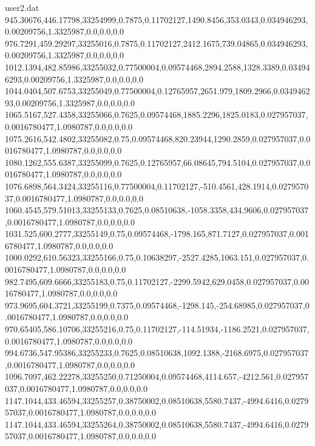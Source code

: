 \begin{filecontents}{user2.dat}
945.30676,446.17798,33254999,0.7875,0.11702127,1490.8456,353.0343,0.034946293,0.00209756,1.3325987,0.0,0.0,0.0
976.7291,459.29297,33255016,0.7875,0.11702127,2412.1675,739.04865,0.034946293,0.00209756,1.3325987,0.0,0.0,0.0
1012.1394,482.85986,33255032,0.77500004,0.09574468,2894.2588,1328.3389,0.034946293,0.00209756,1.3325987,0.0,0.0,0.0
1044.0404,507.6753,33255049,0.77500004,0.12765957,2651.979,1809.2966,0.034946293,0.00209756,1.3325987,0.0,0.0,0.0
1065.5167,527.4358,33255066,0.7625,0.09574468,1885.2296,1825.0183,0.027957037,0.0016780477,1.0980787,0.0,0.0,0.0
1075.2616,542.4802,33255082,0.75,0.09574468,820.23944,1290.2859,0.027957037,0.0016780477,1.0980787,0.0,0.0,0.0
1080.1262,555.6387,33255099,0.7625,0.12765957,66.08645,794.5104,0.027957037,0.0016780477,1.0980787,0.0,0.0,0.0
1076.6898,564.3424,33255116,0.77500004,0.11702127,-510.4561,428.1914,0.027957037,0.0016780477,1.0980787,0.0,0.0,0.0
1060.4545,579.51013,33255133,0.7625,0.08510638,-1058.3358,434.9606,0.027957037,0.0016780477,1.0980787,0.0,0.0,0.0
1031.525,600.2777,33255149,0.75,0.09574468,-1798.165,871.7127,0.027957037,0.0016780477,1.0980787,0.0,0.0,0.0
1000.0292,610.56323,33255166,0.75,0.10638297,-2527.4285,1063.151,0.027957037,0.0016780477,1.0980787,0.0,0.0,0.0
982.7495,609.6666,33255183,0.75,0.11702127,-2299.5942,629.0458,0.027957037,0.0016780477,1.0980787,0.0,0.0,0.0
973.9695,604.3721,33255199,0.7375,0.09574468,-1298.145,-254.68985,0.027957037,0.0016780477,1.0980787,0.0,0.0,0.0
970.65405,586.10706,33255216,0.75,0.11702127,-114.51934,-1186.2521,0.027957037,0.0016780477,1.0980787,0.0,0.0,0.0
994.6736,547.95386,33255233,0.7625,0.08510638,1092.1388,-2168.6975,0.027957037,0.0016780477,1.0980787,0.0,0.0,0.0
1096.7097,462.22278,33255250,0.71250004,0.09574468,4114.657,-4212.561,0.027957037,0.0016780477,1.0980787,0.0,0.0,0.0
1147.1044,433.46594,33255257,0.38750002,0.08510638,5580.7437,-4994.6416,0.027957037,0.0016780477,1.0980787,0.0,0.0,0.0
1147.1044,433.46594,33255264,0.38750002,0.08510638,5580.7437,-4994.6416,0.027957037,0.0016780477,1.0980787,0.0,0.0,0.0
\end{filecontents}